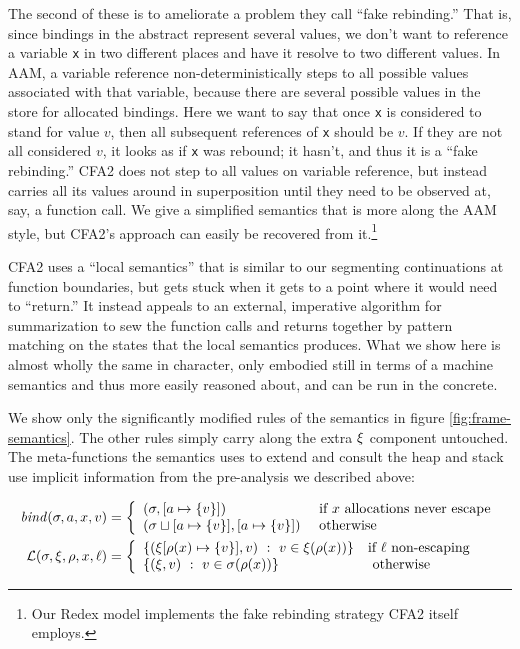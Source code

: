The second of these is to ameliorate a problem they call ``fake rebinding.''
%
That is, since bindings in the abstract represent several values, we don't want to reference a variable \texttt{x} in two different places and have it resolve to two different values.
%
In AAM, a variable reference non-deterministically steps to all possible values associated with that variable, because there are several possible values in the store for allocated bindings.
%
Here we want to say that once \texttt{x} is considered to stand for value $v$, then all subsequent references of \texttt{x} should be $v$.
%
If they are not all considered $v$, it looks as if \texttt{x} was rebound; it hasn't, and thus it is a ``fake rebinding.''
%
CFA2 does not step to all values on variable reference, but instead carries all its values around in superposition until they need to be observed at, say, a function call.
%
We give a simplified semantics that is more along the AAM style, but CFA2's approach can easily be recovered from it.\footnote{Our Redex model implements the fake rebinding strategy CFA2 itself employs.}

CFA2 uses a ``local semantics'' that is similar to our segmenting continuations at function boundaries, but gets stuck when it gets to a point where it would need to ``return.''
%
It instead appeals to an external, imperative algorithm for summarization to sew the function calls and returns together by pattern matching on the states that the local semantics produces.
%
What we show here is almost wholly the same in character, only embodied still in terms of a machine semantics and thus more easily reasoned about, and can be run in the concrete.

We show only the significantly modified rules of the semantics in figure \ref{fig:frame-semantics}.
%
The other rules simply carry along the extra $\xi$ component untouched.
%
The meta-functions the semantics uses to extend and consult the heap and stack use implicit information from the pre-analysis we described above:

\begin{align*}
  \mathit{bind}(\sigma,a,x,v) &=
   \left\{\begin{array}{ll}
            (\sigma, [a \mapsto \{ v \}]) &\text{ if } x \text{ allocations never escape} \\
            (\sigma\sqcup[a \mapsto \{ v \}], [a \mapsto \{ v \}]) &\text{ otherwise} \\
          \end{array}\right. \\
  {\mathcal L}(\sigma,\xi,\rho,x,\ell) &=
    \left\{\begin{array}{ll}
          \{ (\xi[\rho(x) \mapsto \{ v \}], v)\ :\ v \in \xi(\rho(x))\} & \text{if } \ell \text{ non-escaping} \\
          \{ (\xi,v)\ :\ v \in \sigma(\rho(x))\} & \text{ otherwise}
           \end{array}\right.
\end{align*}

